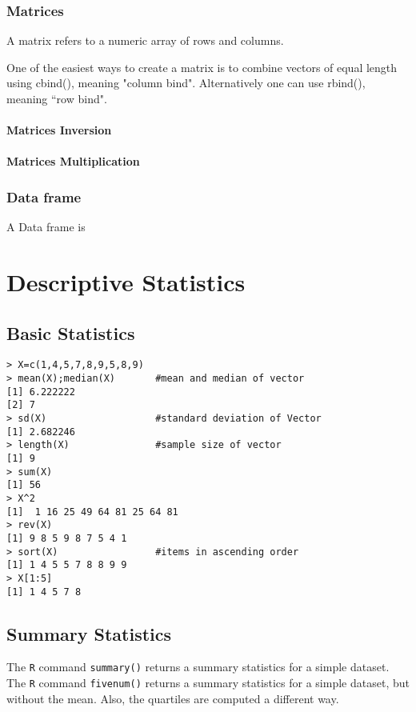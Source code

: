 \documentclass[a4paper,12pt]{article}
\begin{document}

\subsection{Matrices}
A matrix refers to a numeric array of rows and columns.

One of the easiest ways to create a matrix is to combine vectors of equal
length using cbind(), meaning "column bind". Alternatively one can use rbind(), meaning ``row bind".


\subsubsection{Matrices Inversion}
\subsubsection{Matrices Multiplication}


\subsection{Data frame}
A Data frame is
\newpage


\chapter{Descriptive Statistics}

\section{Basic Statistics}

\footnotesize
\begin{myindentpar}{1cm}
\begin{verbatim}
> X=c(1,4,5,7,8,9,5,8,9)
> mean(X);median(X)       #mean and median of vector
[1] 6.222222
[2] 7
> sd(X)                   #standard deviation of Vector
[1] 2.682246
> length(X)               #sample size of vector
[1] 9
> sum(X)
[1] 56
> X^2
[1]  1 16 25 49 64 81 25 64 81
> rev(X)
[1] 9 8 5 9 8 7 5 4 1
> sort(X)                 #items in ascending order
[1] 1 4 5 5 7 8 8 9 9
> X[1:5]
[1] 1 4 5 7 8
\end{verbatim}
\end{myindentpar}
\normalsize


\section{Summary Statistics}
The \texttt{R} command \texttt{summary()} returns a summary statistics for a simple dataset.
The \texttt{R} command \texttt{fivenum()} returns a summary statistics for a simple dataset, but without the mean.
Also, the quartiles are computed a different way.
\end{document}
